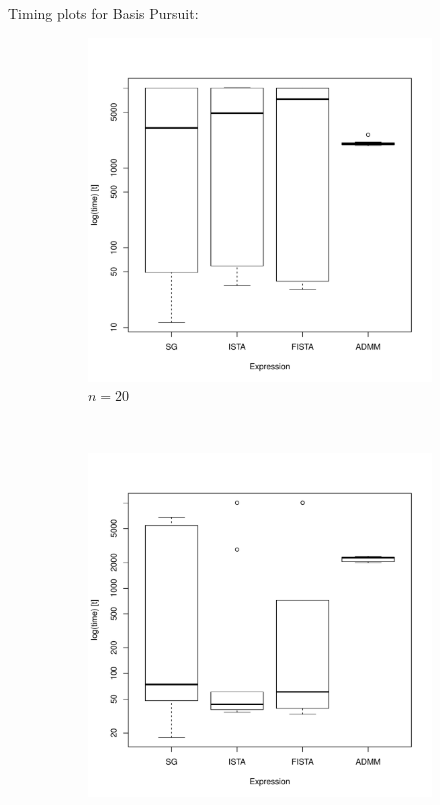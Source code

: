 \documentclass[xcolor=dvipsnames,aspectratio=1610]{beamer}
\theoremstyle{remark}
\begin{document}
\begin{frame}{Timing plots for Basis Pursuit:}
\fontsize{6pt}{7.2}\selectfont
\begin{figure}[H]
  \centering
    \begin{subfigure}[b]{0.2\textwidth}
        \includegraphics[width=\textwidth]{20timing.pdf}
        \caption{$n=20$}
        \label{fig:20}
    \end{subfigure}
~
    \begin{subfigure}[b]{0.2\textwidth}
        \includegraphics[width=\textwidth]{50timing.pdf}

\end{subfigure}
\end{figure}
\end{frame}
\end{document}
